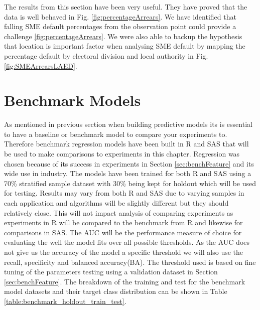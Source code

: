  
The results from this section have been very useful. They have proved that the data is well behaved in Fig. \ref{fig:percentageArrears}. We have identified that falling SME default percentages from the observation point could provide a challenge \ref{fig:percentageArrears}. We were also able to backup the hypothesis that location is important factor when analysing SME default by mapping the percentage default by electoral division and local authority in Fig. \ref{fig:SMEArrearsLAED}. 


\section{Benchmark Models}\label{sec:benchModels}
As mentioned in previous section when building predictive models its is essential to have a baseline or benchmark model to compare your experiments to. Therefore benchmark regression models have been built in R and SAS that will be used to make comparisons to experiments in this chapter. Regression was chosen because of its success in experiments in Section \ref{sec:benchFeature} and its wide use in industry. The models have been trained for both R and SAS using a 70\% stratified sample dataset with 30\% being kept for holdout which will be used for testing. Results may vary from both R and SAS due to varying samples in each application and algorithms will be slightly different but they should relatively close. This will not impact analysis of comparing experiments as experiments in R will be compared to the benchmark from R and likewise for comparisons in SAS. The AUC will be the performance measure of choice for evaluating the well the model fits over all possible thresholds. As the AUC does not give us the accuracy of the model a specific threshold we will also use the recall, specificity and balanced accuracy(BA). The threshold used is based on fine tuning of the parameters testing using a validation dataset in Section \ref{sec:benchFeature}. The breakdown of the training and test for the benchmark model datasets and their target class distribution can be shown in Table \ref{table:benchmark_holdout_train_test}.

